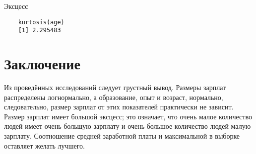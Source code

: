 \documentclass[12pt,a4paper,titlepage]{article}
\begin{document}
  Эксцесс
  \begin{lstlisting}
    kurtosis(age)
    [1] 2.295483
  \end{lstlisting}

\section{Заключение}
  Из проведённых исследований следует грустный вывод.
  Размеры зарплат распределены логнормально, а образование, опыт и возраст, нормально, следовательно, размер зарплат от этих показателей практически не зависит.
  Размер зарплат имеет большой эксцесс; это означает, что очень малое количество людей имеет очень большую зарплату и очень большое количество людей малую зарплату.
  Соотношение средней заработной платы и максимальной в выборке оставляет желать лучшего.
\end{document}
